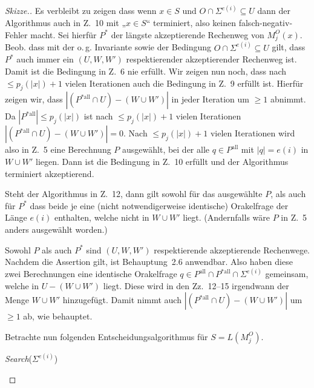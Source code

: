 \documentclass[nofonts]{uebung}
\theoremstyle{definition}
\begin{document}
\begin{proof}[Skizze.]
    Es verbleibt zu zeigen dass wenn $x\in S$ und  $O\cap \Sigma^{e(i)}\subseteq U$ dann der Algorithmus auch in Z.~10 mit „$x\in S$“ terminiert, also keinen falsch-negativ-Fehler macht.
    Sei hierfür $P^*$ der längste akzeptierende Rechenweg von $M_j^O(x)$.
    Beob. dass mit der o.\,g. Invariante sowie der Bedingung $O\cap\Sigma^{e(i)}\subseteq U$ gilt, dass $P^*$ auch immer ein $(U,W,W')$ respektierender akzeptierender Rechenweg ist.
    Damit ist die Bedingung in Z.~6 nie erfüllt.
    Wir zeigen nun noch, dass nach $\leq p_j(|x|)+1$ vielen Iterationen auch die Bedingung in Z.~9 erfüllt ist.
    Hierfür zeigen wir, dass $|(P^{*\mathrm{all}}\cap U)-(W\cup W')|$ in jeder Iteration um $\geq 1$ abnimmt. Da $|P^{*\mathrm{all}}|\leq p_j(|x|)$ ist nach $\leq p_j(|x|)+1$ vielen Iterationen $|(P^{*\mathrm{all}}\cap U)-(W\cup W')|=0$.
    Nach $\leq p_j(|x|)+1$ vielen Iterationen wird also in Z.~5 eine Berechnung $P$ ausgewählt, bei der alle $q\in P^{\mathrm{all}}$ mit $|q|=e(i)$ in $W\cup W'$ liegen. Dann ist die Bedingung in Z.~10 erfüllt und der Algorithmus terminiert akzeptierend.

    Steht der Algorithmus in Z.~12, dann gilt sowohl für das ausgewählte $P$, als auch für $P^*$ dass beide je eine (nicht notwendigerweise identische) Orakelfrage der Länge $e(i)$ enthalten, welche nicht in $W\cup W'$ liegt. (Andernfalls  wäre $P$ in Z.~5 anders ausgewählt worden.)

    Sowohl $P$ als auch $P^*$ sind $(U, W, W')$ respektierende akzeptierende Rechenwege. Nachdem die Assertion gilt, ist Behauptung~2.6 anwendbar. Also haben diese zwei Berechnungen eine identische Orakelfrage $q\in P^\mathrm{all}\cap P^{*\mathrm{all}}\cap \Sigma^{e(i)}$ gemeinsam, welche in $U-(W\cup W')$ liegt.
    Diese wird in den Zz.~12--15 irgendwann der Menge $W\cup W'$ hinzugefügt.
    Damit nimmt auch $|(P^{*\mathrm{all}}\cap U)-(W\cup W')|$ um $\geq 1$ ab, wie behauptet.
    \medskip

    Betrachte nun folgenden Entscheidungsalgorithmus für $S=L(M_j^O)$.

    \noindent
    \begin{algorithm}[H]
        \setcounter{AlgoLine}{17}
        {
            {
            }
            {
            }
        }
        {
            \Return \emph{Search}($\Sigma^{e(i)}$)\;
        }
        \medskip
    \end{algorithm}


\end{proof}
\end{document}
